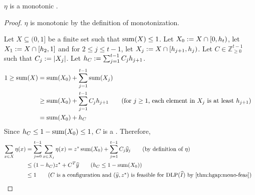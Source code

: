 \begin{lemma}
\label{thm:hgap:eta-dff}
$\eta$ is a monotonic \dff{}.
\end{lemma}
\begin{proof}
$\eta$ is monotonic by the definition of monotonization.

Let $X \subseteq (0, 1]$ be a finite set such that $\operatorname{sum}(X) \le 1$.
Let $X_0 := X \cap [0, h_t)$,
let $X_1 := X \cap [h_2, 1]$
and for $2 \le j \le t-1$, let $X_j := X \cap [h_{j+1}, h_j)$.
Let $C \in \mathbb{Z}^{t-1}_{\ge 0}$ such that $C_j := |X_j|$.
Let $h_C := \sum_{j=1}^{t-1} C_jh_{j+1}$.
\begin{align*}
1 \ge \Sum(X) &= \Sum(X_0) + \sum_{j=1}^{t-1} \Sum(X_j)
\\ &\ge \Sum(X_0) + \sum_{j=1}^{t-1} C_jh_{j+1}
\tag{for $j \ge 1$, each element in $X_j$ is at least $h_{j+1}$}
\\ &= \Sum(X_0) + h_C
\end{align*}
Since $h_C \le 1 - \operatorname{sum}(X_0) \le 1$, $C$ is a \config{}. Therefore,
\begin{align*}
\sum_{x \in X} \eta(x)
&= \sum_{j=0}^{t-1} \sum_{x \in X_j} \eta(x)
= z^*\Sum(X_0) + \sum_{j=1}^{t-1} C_j\yhat_j
\tag{by definition of $\eta$}
\\ &\le (1-h_C)z^* + C^T\yhat
\tag{$h_C \le 1 - \Sum(X_0)$}
\\ &\le 1
\tag{$C$ is a \config{} and $(\yhat, z^*)$ is feasible for $\DLP(\Ihat)$
    by \thmdepcref{thm:hgap:mono-feas}{}}
\end{align*}
\end{proof}


